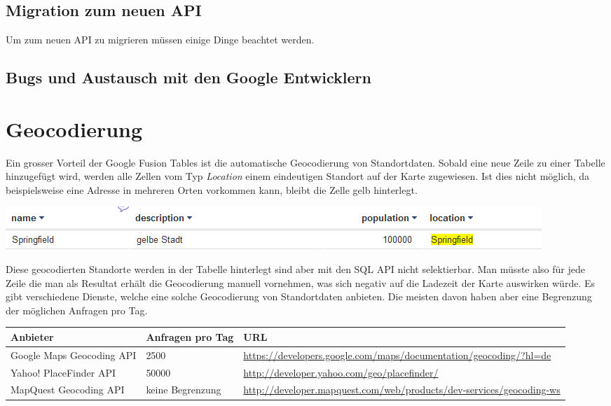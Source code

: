\subsection{Migration zum neuen API}
Um zum neuen API zu migrieren müssen einige Dinge beachtet werden.


\subsection{Bugs und Austausch mit den Google Entwicklern}

\section{Geocodierung}
Ein grosser Vorteil der Google Fusion Tables ist die automatische 
\gls{Geocodierung} von Standortdaten. Sobald eine neue Zeile zu einer Tabelle hinzugefügt wird, werden alle Zellen vom Typ \emph{Location} einem eindeutigen Standort auf der Karte zugewiesen. Ist dies nicht möglich, da beispielsweise eine Adresse in mehreren Orten vorkommen kann, bleibt die Zelle gelb hinterlegt.
 
\includegraphics[scale=0.75]{images/geocoding_failed.png}

Diese geocodierten Standorte werden in der Tabelle hinterlegt sind aber mit den SQL API nicht selektierbar. Man müsste also für jede Zeile die man als Resultat erhält die Geocodierung manuell vornehmen, was sich negativ auf die Ladezeit der Karte auswirken würde.
Es gibt verschiedene Dienste, welche eine solche Geocodierung von Standortdaten anbieten. Die meisten davon haben aber eine Begrenzung der möglichen Anfragen pro Tag.

\begin{tabular}{|l|p{1.9cm}|p{7.3cm}|}
\hline 
Anbieter & Anfragen pro Tag & URL \\ 
\hline 
Google Maps Geocoding API & 2500 & \url{https://developers.google.com/maps/documentation/geocoding/?hl=de} \\ 
\hline 
Yahoo! PlaceFinder API & 50000 & \url{http://developer.yahoo.com/geo/placefinder/} \\ 
\hline 
MapQuest Geocoding API & keine Begrenzung & \url{http://developer.mapquest.com/web/products/dev-services/geocoding-ws} \\ 
\hline 
\end{tabular} 

